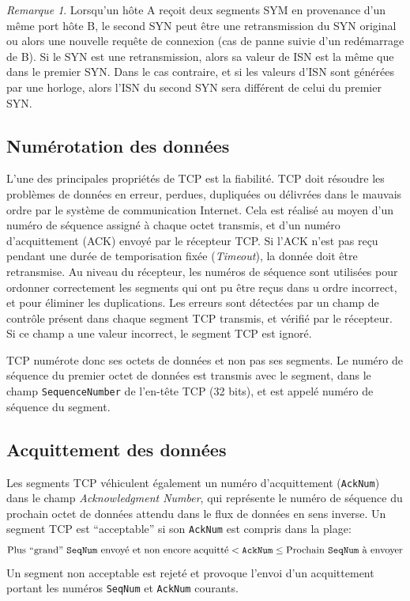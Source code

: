 \documentclass[11pt,english,french]{scrreprt}
\theoremstyle{remark}
\newtheorem*{rem*}{Remarque}
\theoremstyle{definition}
\begin{document}
\begin{rem*} Lorsqu'un hôte A reçoit deux segments SYM en provenance d'un même port hôte B, le second SYN peut être une retransmission du SYN original ou alors une nouvelle requête de connexion (cas de panne suivie d'un redémarrage de B). Si le SYN est une retransmission, alors sa valeur de ISN est la même que dans le premier SYN. Dans le cas contraire, et si les valeurs d'ISN sont générées par une horloge, alors l'ISN du second SYN sera différent de celui du premier SYN.
\end{rem*}

\subsection{Numérotation des données} %

L'une des principales propriétés de TCP est la fiabilité. TCP doit résoudre les problèmes de données en erreur, perdues, dupliquées ou délivrées dans le mauvais ordre par le système de communication Internet. Cela est réalisé au moyen d'un numéro de séquence assigné à chaque octet transmis, et d'un numéro d'acquittement (ACK) envoyé par le récepteur TCP. Si l'ACK n'est pas reçu pendant une durée de temporisation fixée (\emph{Timeout}), la donnée doit être retransmise. Au niveau du récepteur, les numéros de séquence sont utilisées pour ordonner correctement les segments qui ont pu être reçus dans u ordre incorrect, et pour éliminer les duplications. Les erreurs sont détectées par un champ de contrôle présent dans chaque segment TCP transmis, et vérifié par le récepteur. Si ce champ a une valeur incorrect, le segment TCP est ignoré.

TCP numérote donc ses octets de données et non pas ses segments. Le numéro de séquence du premier octet de données est transmis avec le segment, dans le champ \lstinline!SequenceNumber! de l'en-tête TCP (32 bits), et est appelé numéro de séquence du segment.

\subsection{Acquittement des données} %

Les segments TCP véhiculent également un numéro d'acquittement (\lstinline!AckNum!) dans le champ \emph{Acknowledgment Number}, qui représente le numéro de séquence du prochain octet de données attendu dans le flux de données en sens inverse. Un segment TCP est “acceptable” si son \lstinline!AckNum! est compris dans la plage:
\[
           \textrm{Plus “grand” \texttt{SeqNum} envoyé et non encore acquitté} < \texttt{AckNum} \le \textrm{Prochain \texttt{SeqNum} à envoyer}
\]
Un segment non acceptable est rejeté et provoque l'envoi d'un acquittement portant les numéros \lstinline!SeqNum! et \lstinline!AckNum! courants.
\end{document}
